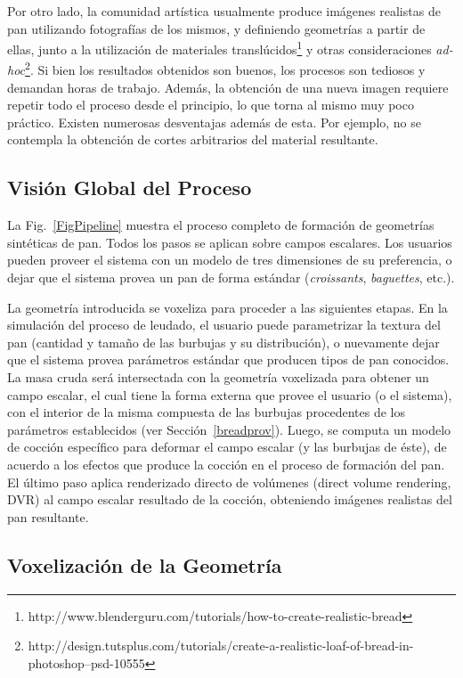 Por otro lado, la comunidad artística usualmente produce imágenes realistas de pan utilizando fotografías de los mismos, y definiendo geometrías a partir de ellas, junto a la utilización de materiales translúcidos\footnote{http://www.blenderguru.com/tutorials/how-to-create-realistic-bread} y otras consideraciones {\em ad-hoc}\footnote{http://design.tutsplus.com/tutorials/create-a-realistic-loaf-of-bread-in-photoshop--psd-10555}.
Si bien los resultados obtenidos son buenos, los procesos son tediosos y demandan horas de trabajo.
Además, la obtención de una nueva imagen requiere repetir todo el proceso desde el principio, lo que torna al mismo muy poco práctico.
Existen numerosas desventajas además de esta.
Por ejemplo, no se contempla la obtención de cortes arbitrarios del material resultante.


\subsection{Visión Global del Proceso}
La Fig.~\ref{FigPipeline} muestra el proceso completo de formación de geometrías sintéticas de pan.
Todos los pasos se aplican sobre campos escalares.
Los usuarios pueden proveer el sistema con un modelo de tres dimensiones de su preferencia, o dejar que el sistema provea un pan de forma estándar ({\em croissants}, {\em baguettes}, etc.).

La geometría introducida se voxeliza para proceder a las siguientes etapas.
En la simulación del proceso de leudado, el usuario puede parametrizar la textura del pan (cantidad y tamaño de las burbujas y su distribución), o nuevamente dejar que el sistema provea parámetros estándar que producen tipos de pan conocidos.
La masa cruda será intersectada con la geometría voxelizada para obtener un campo escalar, el cual tiene la forma externa que provee el usuario (o el sistema), con el interior de la misma compuesta de las burbujas procedentes de los parámetros establecidos (ver Sección~\ref{breadprov}).
Luego, se computa un modelo de cocción específico \cite{Powathil2004} para deformar el campo escalar (y las burbujas de éste), de acuerdo a los efectos que produce la cocción en el proceso de formación del pan.
El último paso aplica renderizado directo de volúmenes (direct volume rendering, DVR) \cite{Kruger2003} al campo escalar resultado de la cocción, obteniendo imágenes realistas del pan resultante.


\subsection{Voxelización de la Geometría}


